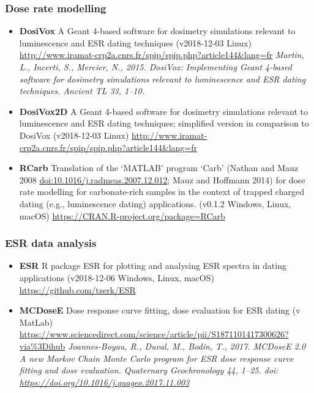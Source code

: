 \documentclass[]{article}
\providecommand{\tightlist}{%
  \setlength{\itemsep}{0pt}\setlength{\parskip}{0pt}}
\begin{document}
\hypertarget{dose-rate-modelling}{%
\subsubsection{Dose rate modelling}\label{dose-rate-modelling}}

\begin{itemize}
\tightlist
\item
  \textbf{DosiVox}
  A Geant 4-based software for dosimetry simulations relevant to luminescence and ESR dating techniques
  (v2018-12-03 \textbar{} Linux)
  \url{http://www.iramat-crp2a.cnrs.fr/spip/spip.php?article144\&lang=fr}
  \emph{Martin, L., Incerti, S., Mercier, N., 2015. DosiVox: Implementing Geant 4-based software for dosimetry simulations relevant to luminescence and ESR dating techniques. Ancient TL 33, 1--10.}
\item
  \textbf{DosiVox2D}
  A Geant 4-based software for dosimetry simulations relevant to luminescence and ESR dating techniques; simplified version in comparison to DosiVox
  (v2018-12-03 \textbar{} Linux)
  \url{http://www.iramat-crp2a.cnrs.fr/spip/spip.php?article144\&lang=fr}
\item
  \textbf{RCarb}
  Translation of the `MATLAB' program `Carb' (Nathan and Mauz 2008 \url{doi:10.1016/j.radmeas.2007.12.012}; Mauz and Hoffmann 2014) for dose rate modelling for carbonate-rich samples in the context of trapped charged dating (e.g., luminescence dating) applications.
  (v0.1.2 \textbar{} Windows, Linux, macOS)
  \url{https://CRAN.R-project.org/package=RCarb}
\end{itemize}

\hypertarget{esr-data-analysis}{%
\subsubsection{ESR data analysis}\label{esr-data-analysis}}

\begin{itemize}
\tightlist
\item
  \textbf{ESR}
  R package ESR for plotting and analysing ESR spectra in dating applications
  (v2018-12-06 \textbar{} Windows, Linux, macOS)
  \url{https://github.com/tzerk/ESR}
\item
  \textbf{MCDoseE}
  Dose response curve fitting, dose evaluation for ESR dating
  (v \textbar{} MatLab)
  \url{https://www.sciencedirect.com/science/article/pii/S1871101417300626?via\%3Dihub}
  \emph{Joannes-Boyau, R., Duval, M., Bodin, T., 2017. MCDoseE 2.0 A new Markov Chain Monte Carlo program for ESR dose response curve fitting and dose evaluation. Quaternary Geochronology 44, 1--25. doi: \url{https://doi.org/10.1016/j.quageo.2017.11.003}}
\end{itemize}
\end{document}
